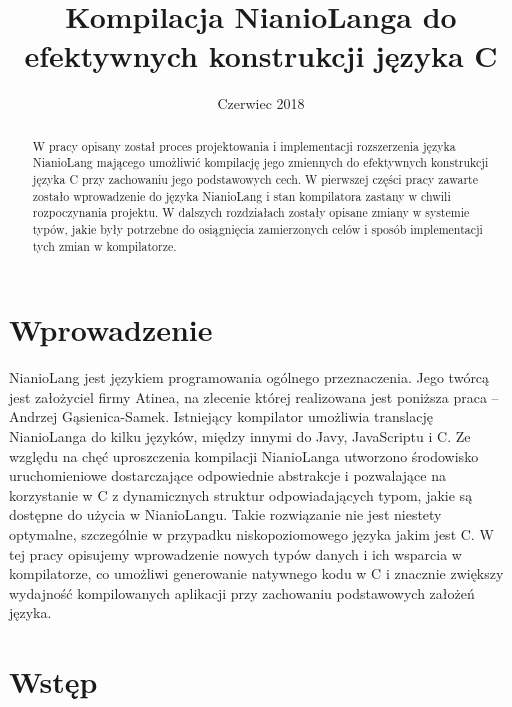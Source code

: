 \documentclass[licencjacka]{pracamgr}
\title{Kompilacja NianioLanga do efektywnych konstrukcji języka C}
\date{Czerwiec 2018}
\begin{document}
\maketitle

\begin{abstract}
W pracy opisany został proces projektowania i implementacji rozszerzenia języka NianioLang mającego umożliwić
kompilację jego zmiennych do efektywnych konstrukcji języka C przy zachowaniu jego podstawowych cech.
W pierwszej części pracy zawarte zostało wprowadzenie do języka NianioLang i stan kompilatora zastany w chwili
rozpoczynania projektu. W dalszych rozdziałach zostały opisane zmiany w systemie typów, jakie były potrzebne
do osiągnięcia zamierzonych celów i sposób implementacji tych zmian w kompilatorze.
\end{abstract}

\tableofcontents

\chapter*{Wprowadzenie}
  NianioLang jest językiem programowania ogólnego przeznaczenia. Jego twórcą jest
  założyciel firmy Atinea, na zlecenie której realizowana jest poniższa
  praca -- Andrzej Gąsienica-Samek.
  Istniejący kompilator umożliwia translację NianioLanga do kilku języków,
  między innymi do Javy, JavaScriptu i C.
  Ze względu na chęć uproszczenia kompilacji NianioLanga
  utworzono środowisko uruchomieniowe dostarczające odpowiednie abstrakcje
  i pozwalające na korzystanie w C z dynamicznych struktur odpowiadających typom,
  jakie są dostępne do użycia w NianioLangu. Takie rozwiązanie nie jest
  niestety optymalne, szczególnie w przypadku niskopoziomowego języka jakim
  jest C. W tej pracy opisujemy wprowadzenie nowych typów danych i ich wsparcia
  w kompilatorze, co umożliwi generowanie natywnego kodu w C i znacznie
  zwiększy wydajność kompilowanych aplikacji przy zachowaniu podstawowych założeń języka.
\chapter{Wstęp}
\end{document}
